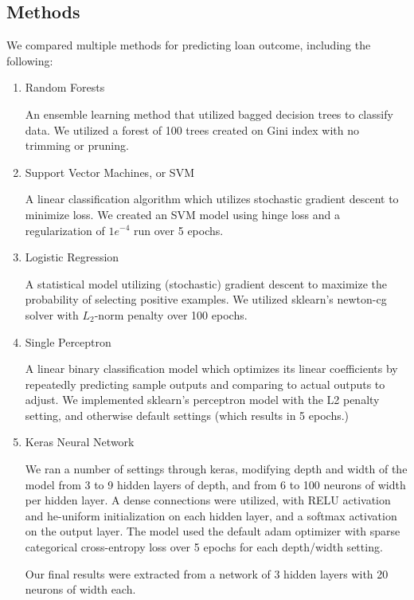 \subsection{Methods}

We compared multiple methods for predicting loan outcome, including the following:

\begin{enumerate}
    \item Random Forests \cite{rand_forest}

        An ensemble learning method that utilized bagged decision trees to classify data. We utilized a forest of 100 trees created on Gini index with no trimming or pruning.

    \item Support Vector Machines, or SVM \cite{svm}

        A linear classification algorithm which utilizes stochastic gradient descent to minimize loss. We created an SVM model using hinge loss and a regularization of $1 e^{-4}$ run over 5 epochs.

    \item Logistic Regression \cite{log_regression}

        A statistical model utilizing (stochastic) gradient descent to maximize the probability of selecting positive examples. We utilized sklearn's newton-cg solver with $L_2$-norm penalty over 100 epochs.

    \item Single Perceptron \cite{perceptron}

        A linear binary classification model which optimizes its linear coefficients by repeatedly predicting sample outputs and comparing to actual outputs to adjust. We implemented sklearn's perceptron model with the L2 penalty setting, and otherwise default settings (which results in 5 epochs.)

    \item Keras Neural Network \cite{keras}

        We ran a number of settings through keras, modifying depth and width of the model from 3 to 9 hidden layers of depth, and from 6 to 100 neurons of width per hidden layer. A dense connections were utilized, with RELU activation and he-uniform initialization on each hidden layer, and a softmax activation on the output layer. The model used the default adam optimizer with sparse categorical cross-entropy loss over 5 epochs for each depth/width setting.

        Our final results were extracted from a network of 3 hidden layers with 20 neurons of width each.

\end{enumerate}

